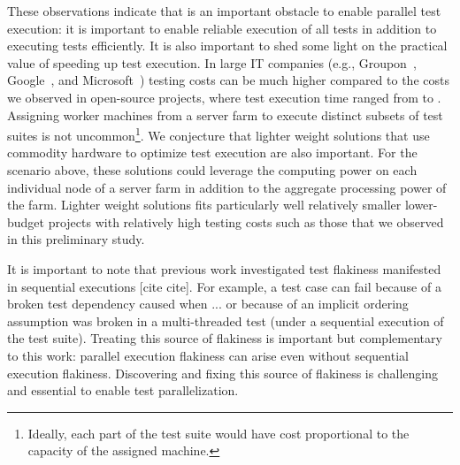 




These observations indicate that \pef{} is an important obstacle to
enable parallel test execution: it is important to enable reliable
execution of all tests in addition to executing tests efficiently.  It
is also important to shed some light on the practical value of
speeding up test execution.  In large IT companies (e.g.,
Groupon~, Google~, and Microsoft~)
testing costs can be much higher compared to the costs we observed in
open-source projects, where test execution time ranged from 
to .  Assigning worker machines from a server farm to execute
distinct subsets of test suites is not
uncommon\footnote{Ideally, each part of the test suite
  would have cost proportional to the capacity of the assigned
  machine.}.  We conjecture that lighter weight solutions that use
commodity hardware to optimize test execution are also important.  For
the scenario above, these solutions could leverage the computing power
on each individual node of a server farm in addition to the aggregate
processing power of the farm.  Lighter weight solutions fits
particularly well relatively smaller lower-budget projects with
relatively high testing costs such as those that we observed in this
preliminary study.

It is important to note that previous work investigated test flakiness
manifested in sequential executions [cite cite].  For example, a test
case can fail because of a broken test dependency caused when ... or
because of an implicit ordering assumption was broken in a
multi-threaded test (under a sequential execution of the test suite).
Treating this source of flakiness is important but complementary to
this work: parallel execution flakiness can arise even without
sequential execution flakiness.  Discovering and fixing this source of
flakiness is challenging and essential to enable test parallelization.


